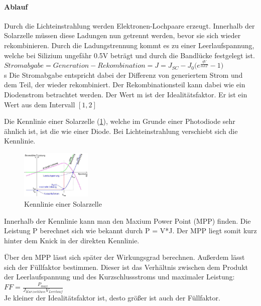 		\paragraph{Ablauf}
		Durch die Lichteinstrahlung werden Elektronen-Lochpaare erzeugt. Innerhalb der Solarzelle müssen diese Ladungen nun getrennt werden, bevor sie sich wieder rekombinieren. Durch die Ladungstrennung kommt es zu einer Leerlaufspannung, welche bei Silizium ungefähr 0.5V beträgt und durch die Bandlücke festgelegt ist.  \\
		$Stromabgabe = Generation - Rekombination = J = J_{SC} - J_0 \bigg(e^{\frac{qV}{mkT}}-1\bigg)$\\s
		Die Stromabgabe entspricht dabei der Differenz von generiertem Strom und dem Teil, der wieder rekombiniert. Der Rekombinationsteil kann dabei wie ein Diodenstrom betrachtet werden. Der Wert m ist der Idealitätsfaktor. Er ist ein Wert aus dem Intervall $[1,2]$
		
		Die Kennlinie einer Solarzelle (\ref{9_kennlinie}), welche im Grunde einer Photodiode sehr ähnlich ist, ist die wie einer Diode. Bei Lichteinstrahlung verschiebt sich die Kennlinie.
		
		\begin{figure}[h]
			\centering
			\includegraphics[width=0.3\textwidth]{Kapitel/Kap09/kennlinie.png}
			\caption{Kennlinie einer Solarzelle}
			\label{9_kennlinie}
		\end{figure}
		
		Innerhalb der Kennlinie kann man den Maxium Power Point (MPP) finden. Die Leistung P berechnet sich wie bekannt durch P = V*J. Der MPP liegt somit kurz hinter dem Knick in der direkten Kennlinie. 
		
		Über den MPP lässt sich später der Wirkungsgrad berechnen. Außerdem lässt sich der Füllfaktor bestimmen. Dieser ist das Verhältnis zwischen dem Produkt der Leerlaufspannung und des Kurzschlussstroms und maximaler Leistung:\\
		
		$ FF = \frac{P_{max}}{J_{Kurzschluss}V_{Leerlauf}}$\\

		Je kleiner der Idealitätsfaktor ist, desto größer ist auch der Füllfaktor.


